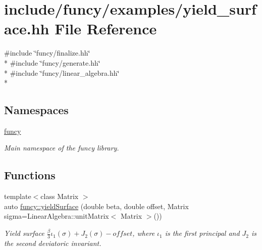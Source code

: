 \hypertarget{yield__surface_8hh}{\section{include/funcy/examples/yield\-\_\-surface.hh File Reference}
\label{yield__surface_8hh}
}
{\ttfamily \#include \char`\"{}funcy/finalize.\-hh\char`\"{}}\\*
{\ttfamily \#include \char`\"{}funcy/generate.\-hh\char`\"{}}\\*
{\ttfamily \#include \char`\"{}funcy/linear\-\_\-algebra.\-hh\char`\"{}}\\*
\subsection*{Namespaces}
\begin{DoxyCompactItemize}
\item 
\hyperlink{namespacefuncy}{funcy}
\begin{DoxyCompactList}\small\item\em Main namespace of the funcy library. \end{DoxyCompactList}\end{DoxyCompactItemize}
\subsection*{Functions}
\begin{DoxyCompactItemize}
\item 
{\footnotesize template$<$class Matrix $>$ }\\auto \hyperlink{namespacefuncy_a2868b162297651eb5666369ebc112d81}{funcy\-::yield\-Surface} (double beta, double offset, Matrix sigma=Linear\-Algebra\-::unit\-Matrix$<$ Matrix $>$())
\begin{DoxyCompactList}\small\item\em Yield surface $ \frac{\beta}{3}\iota_1(\sigma) + J_2(\sigma)-offset $, where $\iota_1$ is the first principal and $J_2$ is the second deviatoric invariant. \end{DoxyCompactList}\end{DoxyCompactItemize}
